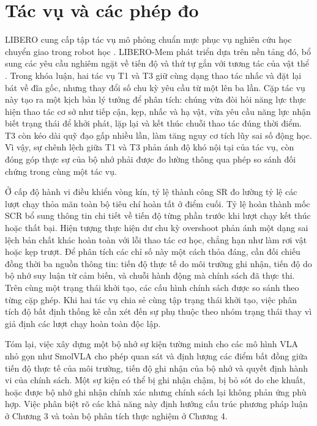 \section{Tác vụ và các phép đo}

LIBERO cung cấp tập tác vụ mô phỏng chuẩn mực phục vụ nghiên cứu học chuyển giao trong robot học \cite{libero2023}. LIBERO-Mem phát triển dựa trên nền tảng đó, bổ sung các yêu cầu nghiêm ngặt về tiến độ và thứ tự gắn với tương tác của vật thể \cite{liberomem2025}. Trong khóa luận, hai tác vụ T1 và T3 giữ cùng dạng thao tác nhấc và đặt lại bát về đĩa gốc, nhưng thay đổi số chu kỳ yêu cầu từ một lên ba lần. Cặp tác vụ này tạo ra một kịch bản lý tưởng để phân tích: chúng vừa đòi hỏi năng lực thực hiện thao tác cơ sở như tiếp cận, kẹp, nhấc và hạ vật, vừa yêu cầu năng lực nhận biết trạng thái để khởi phát, lặp lại và kết thúc chuỗi thao tác đúng thời điểm. T3 còn kéo dài quỹ đạo gấp nhiều lần, làm tăng nguy cơ tích lũy sai số động học. Vì vậy, sự chênh lệch giữa T1 và T3 phản ánh độ khó nội tại của tác vụ, còn đóng góp thực sự của bộ nhớ phải được đo lường thông qua phép so sánh đối chứng trong cùng một tác vụ.

Ở cấp độ hành vi điều khiển vòng kín, tỷ lệ thành công SR đo lường tỷ lệ các lượt chạy thỏa mãn toàn bộ tiêu chí hoàn tất ở điểm cuối. Tỷ lệ hoàn thành mốc SCR bổ sung thông tin chi tiết về tiến độ từng phần trước khi lượt chạy kết thúc hoặc thất bại. Hiện tượng thực hiện dư chu kỳ overshoot phản ánh một dạng sai lệch bản chất khác hoàn toàn với lỗi thao tác cơ học, chẳng hạn như làm rơi vật hoặc kẹp trượt. Để phân tích các chỉ số này một cách thỏa đáng, cần đối chiếu đồng thời ba nguồn thông tin: tiến độ thực tế do môi trường ghi nhận, tiến độ do bộ nhớ suy luận từ cảm biến, và chuỗi hành động mà chính sách đã thực thi. Trên cùng một trạng thái khởi tạo, các cấu hình chính sách được so sánh theo từng cặp ghép. Khi hai tác vụ chia sẻ cùng tập trạng thái khởi tạo, việc phân tích độ bất định thống kê cần xét đến sự phụ thuộc theo nhóm trạng thái thay vì giả định các lượt chạy hoàn toàn độc lập.

Tóm lại, việc xây dựng một bộ nhớ sự kiện tường minh cho các mô hình VLA nhỏ gọn như SmolVLA cho phép quan sát và định lượng các điểm bất đồng giữa tiến độ thực tế của môi trường, tiến độ ghi nhận của bộ nhớ và quyết định hành vi của chính sách. Một sự kiện có thể bị ghi nhận chậm, bị bỏ sót do che khuất, hoặc được bộ nhớ ghi nhận chính xác nhưng chính sách lại không phản ứng phù hợp. Việc phân biệt rõ các khả năng này định hướng cấu trúc phương pháp luận ở Chương 3 và toàn bộ phân tích thực nghiệm ở Chương 4.
